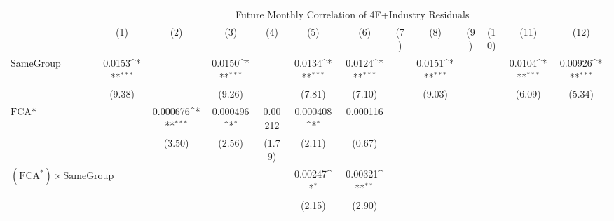 {
\def\sym#1{\ifmmode^{#1}\else\(^{#1}\)\fi}
\begin{tabular}{l*{12}{c}}
\hline\hline
                &\multicolumn{12}{c}{Future Monthly Correlation of 4F+Industry Residuals}                                                                                                                                                           \\\cmidrule(lr){2-13}
                &\multicolumn{1}{c}{(1)}         &\multicolumn{1}{c}{(2)}         &\multicolumn{1}{c}{(3)}         &\multicolumn{1}{c}{(4)}         &\multicolumn{1}{c}{(5)}         &\multicolumn{1}{c}{(6)}         &\multicolumn{1}{c}{(7)}         &\multicolumn{1}{c}{(8)}         &\multicolumn{1}{c}{(9)}         &\multicolumn{1}{c}{(10)}         &\multicolumn{1}{c}{(11)}         &\multicolumn{1}{c}{(12)}         \\
\hline
SameGroup       &   0.0153\sym{***}&                  &   0.0150\sym{***}&                  &   0.0134\sym{***}&   0.0124\sym{***}&                  &   0.0151\sym{***}&                  &                  &   0.0104\sym{***}&  0.00926\sym{***}\\
                &   (9.38)         &                  &   (9.26)         &                  &   (7.81)         &   (7.10)         &                  &   (9.03)         &                  &                  &   (6.09)         &   (5.34)         \\
[1em]
$ \text{FCA*} $ &                  & 0.000676\sym{***}& 0.000496\sym{*}  &  0.00212         & 0.000408\sym{*}  & 0.000116         &                  &                  &                  &                  &                  &                  \\
                &                  &   (3.50)         &   (2.56)         &   (1.79)         &   (2.11)         &   (0.67)         &                  &                  &                  &                  &                  &                  \\
[1em]
 $ (\text{FCA}^*) \times {\text{SameGroup} }  $ &                  &                  &                  &                  &  0.00247\sym{*}  &  0.00321\sym{**} &                  &                  &                  &                  &                  &                  \\
                &                  &                  &                  &                  &   (2.15)         &   (2.90)         &                  &                  &                  &                  &                  &                  \\

\end{tabular}}
